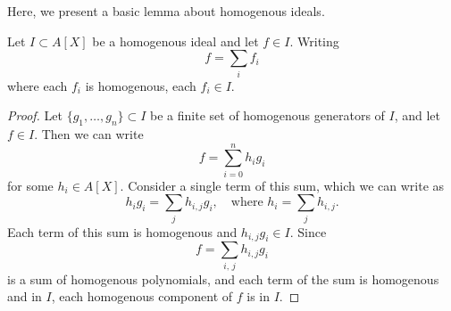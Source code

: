 Here, we present a basic lemma about homogenous ideals.

\begin{lemma}\label{lem:homo_components}
  Let $I \subset A[X]$ be a homogenous ideal and let $f \in I$. Writing
  \[f = \sum_{i} f_{i}\]
  where each $f_{i}$ is homogenous, each $f_{i} \in I$.
\end{lemma}
\begin{proof}
  Let $\{g_{1}, \dots, g_{n}\} \subset I$ be a finite set of homogenous generators of $I$, and let $f \in I$. Then we can write
  \[f = \sum_{i=0}^{n} h_{i} g_{i}\]
  for some $h_{i} \in A[X]$. Consider a single term of this sum, which we can write as
  \[h_{i} g_{i} = \sum_{j} h_{i,j} g_{i}, \quad \text{where } h_{i} = \sum_{j} h_{i,j}.\]
  Each term of this sum is homogenous and $h_{i,j} g_{i} \in I$. Since
  \[f = \sum_{i,\,j} h_{i,j} g_{i}\]
  is a sum of homogenous polynomials, and each term of the sum is homogenous and in $I$, each homogenous component of $f$ is in $I$.
\end{proof}
